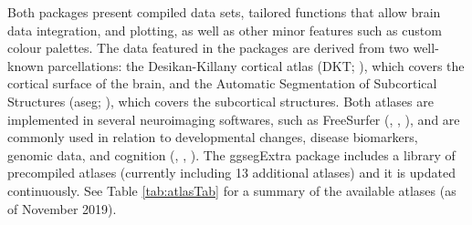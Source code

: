 \documentclass[fleqn,10pt]{wlpeerj} %
\begin{document}
Both packages present compiled data sets, tailored functions that allow brain data integration, and plotting, as well as other minor features such as custom colour palettes.
The data featured in the packages are derived from two well-known parcellations: the Desikan-Killany cortical atlas (DKT; \citet{dkt}), which covers the cortical surface of the brain, and the Automatic Segmentation of Subcortical Structures (aseg; \citet{aseg}), which covers the subcortical structures.
Both atlases are implemented in several neuroimaging softwares, such as FreeSurfer (\citet{fischl_99}, \citet{dale_99}, \citet{Fischl2000}), and are commonly used in relation to developmental changes, disease biomarkers, genomic data, and cognition (\citet{amlien_elaboration_2019}, \citet{WALHOVD20051261}, \citet{Pizzagalli}).
The ggsegExtra package includes a library of precompiled atlases (currently including 13 additional atlases) and it is updated continuously.
See Table \ref{tab:atlasTab} for a summary of the available atlases (as of November 2019).
\end{document}
